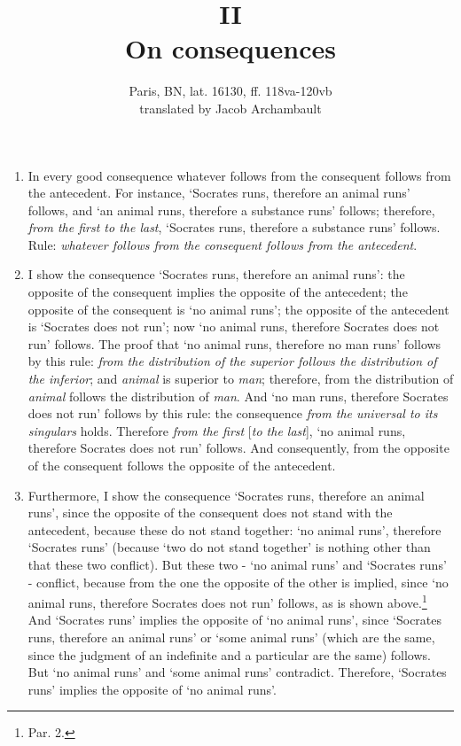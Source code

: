 \documentclass[]{article}
\title{II
\\ On consequences}
\author{Paris, BN, lat. 16130, ff. 118va-120vb
\\ translated by Jacob Archambault}
\begin{document}
\maketitle
\begin{enumerate}
\item[1.] In every good consequence whatever follows from the consequent follows from the antecedent. For instance, `Socrates runs, therefore an animal runs' follows, and `an animal runs, therefore a substance runs' follows; therefore, \textit{from the first to the last}, `Socrates runs, therefore a substance runs' follows. Rule: \textit{whatever follows from the consequent follows from the antecedent}.
\item[2.] I show the consequence `Socrates runs, therefore an animal runs': the opposite of the consequent implies the opposite of the antecedent; the opposite of the consequent is `no animal runs'; the opposite of the antecedent is `Socrates does not run'; now `no animal runs, therefore Socrates does not run' follows. The proof that `no animal runs, therefore no man runs' follows by this rule: \textit{from the distribution of the superior follows the distribution of the inferior}; and \textit{animal} is superior to \textit{man}; therefore, from the distribution of \textit{animal} follows the distribution of \textit{man}. And `no man runs, therefore Socrates does not run' follows by this rule: the consequence \textit{from the universal to its singulars} holds. Therefore \textit{from the first} [\textit{to the last}], `no animal runs, therefore Socrates does not run' follows. And consequently, from the opposite of the consequent follows the opposite of the antecedent.
\item[3.] Furthermore, I show the consequence `Socrates runs, therefore an animal runs', since the opposite of the consequent does not stand with the antecedent, because these do not stand together: `no animal runs', therefore `Socrates runs' (because `two do not stand together' is nothing other than that these two conflict). But these two - `no animal runs' and `Socrates runs' - conflict, because from the one the opposite of the other is implied, since `no animal runs, therefore Socrates does not run' follows, as is shown above.\footnote{Par. 2.} And `Socrates runs' implies the opposite of `no animal runs', since `Socrates runs, therefore an animal runs' or `some animal runs' (which are the same, since the judgment of an indefinite and a particular are the same) follows. But `no animal runs' and `some animal runs' contradict. Therefore, `Socrates runs' implies the opposite of `no animal runs'.

\end{enumerate}
\end{document}
